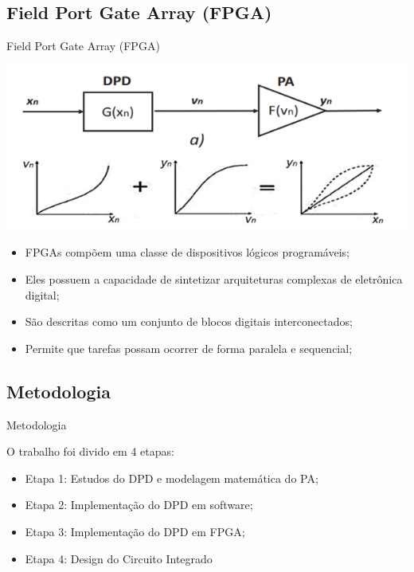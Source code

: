 \documentclass{if-beamer}
\begin{document}
\subsection{Field Port Gate Array (FPGA)}
\begin{frame}{Field Port Gate Array (FPGA)}
	\begin{minipage}{0.5\textwidth}
	
			\includegraphics[scale=0.5]{DPDCascata.png}
		
	\end{minipage}%
	\hspace{0.04\textwidth}
	\begin{minipage}{0.5\textwidth}
		\begin{itemize}
			\item FPGAs compõem uma classe de dispositivos lógicos programáveis;
			\item Eles possuem a capacidade de sintetizar arquiteturas complexas de eletrônica digital;
			\item São descritas como um conjunto de blocos digitais interconectados;
			\item Permite que tarefas possam ocorrer de forma paralela e sequencial;
			
		\end{itemize}
	\end{minipage}
\end{frame}
\subsection{Metodologia}
\begin{frame}{Metodologia}
	\begin{minipage}{0.5\textwidth}
		
		
	\end{minipage}%
	\hspace{0.04\textwidth}
	\begin{minipage}{0.5\textwidth}
		 O trabalho foi divido em 4 etapas:
		\begin{itemize}
			\item Etapa 1: Estudos do DPD e modelagem matemática do PA;
			\item Etapa 2: Implementação do DPD em software;
			\item Etapa 3: Implementação do DPD em FPGA;
			\item Etapa 4: Design do Circuito Integrado
		\end{itemize}
	\end{minipage}
\end{frame}
\end{document}
